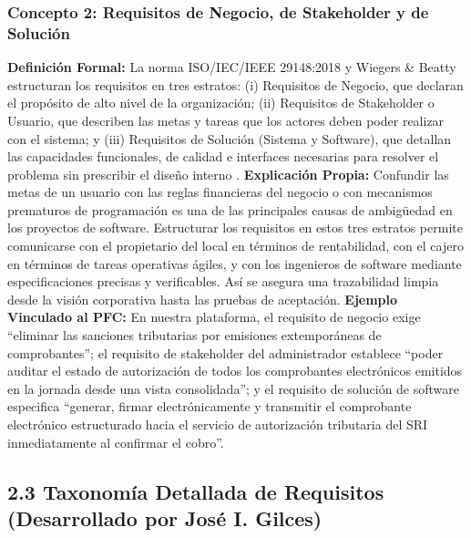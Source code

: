 \documentclass[conference,10pt]{IEEEtran}
\begin{document}
	\subsubsection{Concepto 2: Requisitos de Negocio, de Stakeholder y de Solución}
	\textbf{Definición Formal:} La norma ISO/IEC/IEEE 29148:2018 \cite{ieee29148} y Wiegers \& Beatty \cite{wiegers2013} estructuran los requisitos en tres estratos: (i) Requisitos de Negocio, que declaran el propósito de alto nivel de la organización; (ii) Requisitos de Stakeholder o Usuario, que describen las metas y tareas que los actores deben poder realizar con el sistema; y (iii) Requisitos de Solución (Sistema y Software), que detallan las capacidades funcionales, de calidad e interfaces necesarias para resolver el problema sin prescribir el diseño interno \cite{ieee29148, ireb2023}.
	\textbf{Explicación Propia:} Confundir las metas de un usuario con las reglas financieras del negocio o con mecanismos prematuros de programación es una de las principales causas de ambigüedad en los proyectos de software. Estructurar los requisitos en estos tres estratos permite comunicarse con el propietario del local en términos de rentabilidad, con el cajero en términos de tareas operativas ágiles, y con los ingenieros de software mediante especificaciones precisas y verificables. Así se asegura una trazabilidad limpia desde la visión corporativa hasta las pruebas de aceptación.
	\textbf{Ejemplo Vinculado al PFC:} En nuestra plataforma, el requisito de negocio exige ``eliminar las sanciones tributarias por emisiones extemporáneas de comprobantes''; el requisito de stakeholder del administrador establece ``poder auditar el estado de autorización de todos los comprobantes electrónicos emitidos en la jornada desde una vista consolidada''; y el requisito de solución de software especifica ``generar, firmar electrónicamente y transmitir el comprobante electrónico estructurado hacia el servicio de autorización tributaria del SRI inmediatamente al confirmar el cobro''.
	\subsection{2.3 Taxonomía Detallada de Requisitos (Desarrollado por José I. Gilces)}
\end{document}
